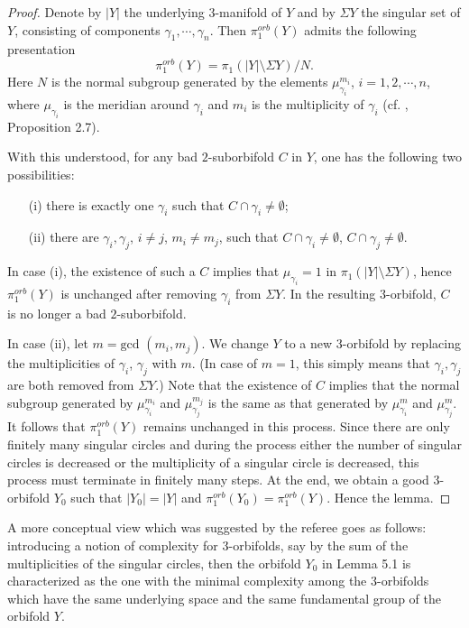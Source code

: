 \documentclass[11pt]{amsart}
\theoremstyle{plain}
\numberwithin{theorem}{section}
\theoremstyle{definition}
\begin{document}
\begin{proof}
Denote by $|Y|$ the underlying $3$-manifold of $Y$ and by $\Sigma Y$ the singular set of $Y$,
consisting of components $\gamma_1,\cdots, \gamma_n$. Then $\pi_1^{orb}(Y)$ admits the 
following presentation
$$
\pi_1^{orb}(Y)=\pi_1(|Y|\setminus \Sigma Y)/N.
$$
Here $N$ is the normal subgroup generated by the elements $\mu_{\gamma_i}^{m_i}$,
$i=1,2,\cdots,n$, where $\mu_{\gamma_i}$ is the meridian around $\gamma_i$ and $m_i$ is the multiplicity of $\gamma_i$ (cf. \cite{BMP}, Proposition 2.7). 

With this understood, for any bad $2$-suborbifold $C$ in $Y$, one has the following two
possibilities: 

\begin{itemize}
\item [{(i)}] there is exactly one $\gamma_i$ such that $C\cap \gamma_i\neq \emptyset$;
\item [{(ii)}] there are $\gamma_i,\gamma_j$, $i\neq j$, $m_i\neq m_j$, such that 
$C\cap \gamma_i\neq \emptyset$, $C\cap \gamma_j\neq \emptyset$.
\end{itemize}

In case (i), the existence of such a $C$ implies that $\mu_{\gamma_i}=1$ in $\pi_1(|Y|\setminus
\Sigma Y)$, hence $\pi_1^{orb}(Y)$ is unchanged after removing $\gamma_i$ from $\Sigma Y$.
In the resulting $3$-orbifold, $C$ is no longer a bad $2$-suborbifold. 

In case (ii), let $m=\text{gcd }(m_i,m_j)$. We change $Y$ to a new $3$-orbifold by replacing 
the multiplicities of $\gamma_i$, $\gamma_j$ with $m$. (In case of $m=1$, this simply means 
that $\gamma_i,\gamma_j$ are both removed from $\Sigma Y$.) Note that the existence of $C$
implies that the normal subgroup generated by $\mu_{\gamma_i}^{m_i}$ and 
$\mu_{\gamma_j}^{m_j}$ is the same as that generated by $\mu_{\gamma_i}^{m}$ and 
$\mu_{\gamma_j}^{m}$. It follows that $\pi_1^{orb}(Y)$ remains unchanged in this process.
Since there are only finitely many singular circles and during the process either the 
number of singular circles is decreased or the multiplicity of a singular circle is
decreased, this process must terminate in finitely many steps. At the end, we obtain a good $3$-orbifold $Y_0$ such that $|Y_0|=|Y|$ and $\pi_1^{orb}(Y_0)=\pi_1^{orb}(Y)$. Hence the lemma.

\end{proof}

A more conceptual view which was suggested by the referee goes as follows: introducing a notion of
complexity for $3$-orbifolds, say by the sum of the multiplicities of the singular circles, then the orbifold
$Y_0$ in Lemma 5.1 is characterized as the one with the minimal complexity among the $3$-orbifolds 
which have the same underlying space and the same fundamental group of the orbifold $Y$. 
\end{document}
